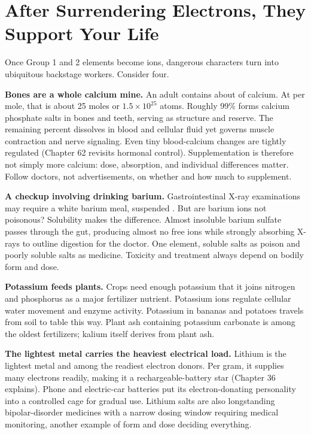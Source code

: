 \section{After Surrendering Electrons, They Support Your Life}

Once Group 1 and 2 elements become ions, dangerous characters turn into ubiquitous backstage workers. Consider four.

\textbf{Bones are a whole calcium mine.} An adult contains about  of calcium. At  per mole, that is about 25 moles or $1.5\times 10^{25}$ atoms. Roughly 99\% forms calcium phosphate salts in bones and teeth, serving as structure and reserve. The remaining percent dissolves in blood and cellular fluid yet governs muscle contraction and nerve signaling. Even tiny blood-calcium changes are tightly regulated (Chapter 62 revisits hormonal control). Supplementation is therefore not simply more calcium: dose, absorption, and individual differences matter. Follow doctors, not advertisements, on whether and how much to supplement.

\textbf{A checkup involving drinking barium.} Gastrointestinal X-ray examinations may require a white barium meal, suspended . But are barium ions not poisonous? Solubility makes the difference. Almost insoluble barium sulfate passes through the gut, producing almost no free ions while strongly absorbing X-rays to outline digestion for the doctor. One element, soluble salts as poison and poorly soluble salts as medicine. Toxicity and treatment always depend on bodily form and dose.

\textbf{Potassium feeds plants.} Crops need enough potassium that it joins nitrogen and phosphorus as a major fertilizer nutrient. Potassium ions regulate cellular water movement and enzyme activity. Potassium in bananas and potatoes travels from soil to table this way. Plant ash containing potassium carbonate is among the oldest fertilizers; kalium itself derives from plant ash.

\textbf{The lightest metal carries the heaviest electrical load.} Lithium is the lightest metal and among the readiest electron donors. Per gram, it supplies many electrons readily, making it a rechargeable-battery star (Chapter 36 explains). Phone and electric-car batteries put its electron-donating personality into a controlled cage for gradual use. Lithium salts are also longstanding bipolar-disorder medicines with a narrow dosing window requiring medical monitoring, another example of form and dose deciding everything.


